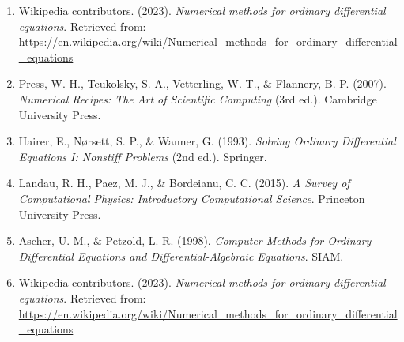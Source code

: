 \documentclass[12pt]{article}
\begin{document}
\begin{enumerate}
    \item Wikipedia contributors. (2023). \textit{Numerical methods for ordinary differential equations}. Retrieved from: \url{https://en.wikipedia.org/wiki/Numerical_methods_for_ordinary_differential_equations}
     \item Press, W. H., Teukolsky, S. A., Vetterling, W. T., \& Flannery, B. P. (2007). \textit{Numerical Recipes: The Art of Scientific Computing} (3rd ed.). Cambridge University Press.
    \item Hairer, E., Nørsett, S. P., \& Wanner, G. (1993). \textit{Solving Ordinary Differential Equations I: Nonstiff Problems} (2nd ed.). Springer.
    \item Landau, R. H., Paez, M. J., \& Bordeianu, C. C. (2015). \textit{A Survey of Computational Physics: Introductory Computational Science}. Princeton University Press.
    \item Ascher, U. M., \& Petzold, L. R. (1998). \textit{Computer Methods for Ordinary Differential Equations and Differential-Algebraic Equations}. SIAM.
    \item Wikipedia contributors. (2023). \textit{Numerical methods for ordinary differential equations}. Retrieved from: \url{https://en.wikipedia.org/wiki/Numerical_methods_for_ordinary_differential_equations}
\end{enumerate}
\end{document}
